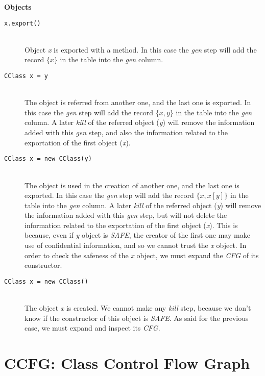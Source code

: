 \documentclass[letterpaper,twocolumn,10pt]{article}
\begin{document}
\noindent\textbf{Objects}
\begin{description}
\item[\texttt{x.export()}] \hfill \\
Object \emph{x} is exported with a method. In this case the \emph{gen} step will add the record $\{x\}$ in the table into the \emph{gen} column.

\item[\texttt{CClass x = y}] \hfill \\
The object is referred from another one, and the last one is exported. In this case the \emph{gen} step will add the record $\{x, y\}$ in the table into the \emph{gen} column. A later \emph{kill} of the referred object (\emph{y}) will remove the information added with this \emph{gen} step, and also the information related to the exportation of the first object (\emph{x}).

\item[\texttt{CClass x = new CClass(y)}] \hfill \\
The object is used in the creation of another one, and the last one is exported. In this case the \emph{gen} step will add the record $\{x, x[y]\}$ in the table into the \emph{gen} column. A later \emph{kill} of the referred object (\emph{y}) will remove the information added with this \emph{gen} step, but will not delete the information related to the exportation of the first object (\emph{x}). This is because, even if \emph{y} object is \emph{SAFE}, the creator of the first one may make use of confidential information, and so we cannot trust the \emph{x} object. In order to check the safeness of the \emph{x} object, we must expand the \emph{CFG} of its constructor.

\item[\texttt{CClass x = new CClass()}] \hfill \\
The object \emph{x} is created. We cannot make any \emph{kill} step, because we don't know if the constructor of this object is \emph{SAFE}. As said for the previous case, we must expand and inspect its \emph{CFG}.
\end{description}


\section{CCFG: Class Control Flow Graph~\cite{CCFG}}
\end{document}
